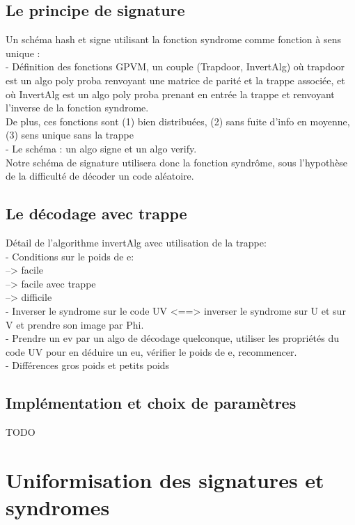 \documentclass[12pt]{article}
\theoremstyle{definition}
\begin{document}
\subsection{Le principe de signature}
Un schéma hash et signe utilisant la fonction syndrome comme fonction à sens unique : \\
- Définition des fonctions GPVM, un couple (Trapdoor, InvertAlg) où trapdoor est un algo poly proba renvoyant une matrice de parité et la trappe associée, et où InvertAlg est un algo poly proba prenant en entrée la trappe et renvoyant l'inverse de la fonction syndrome. \\
De plus, ces fonctions sont (1) bien distribuées, (2) sans fuite d'info en moyenne, (3) sens unique sans la trappe \\
- Le schéma : un algo signe et un algo verify. \\

Notre schéma de signature utilisera donc la fonction syndrôme, sous l'hypothèse de la difficulté de décoder un code aléatoire. \\



\subsection{Le décodage avec trappe}
Détail de l'algorithme invertAlg avec utilisation de la trappe: \\
- Conditions sur le poids de e: \\
--> facile \\
--> facile avec trappe \\
--> difficile \\
- Inverser le syndrome sur le code UV <==> inverser le syndrome sur U et sur V et prendre son image par Phi. \\
- Prendre un ev par un algo de décodage quelconque, utiliser les propriétés du code UV pour en déduire un eu, vérifier le poids de e, recommencer. \\
- Différences gros poids et petits poids \\

\subsection{Implémentation et choix de paramètres}
TODO \\

\section{Uniformisation des signatures et syndromes}
\end{document}

